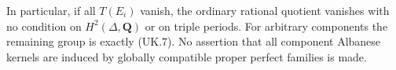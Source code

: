 In particular, if all $T(E_i)$ vanish, the ordinary rational quotient
vanishes with no condition on $H^2(\Delta,\mathbf Q)$ or on triple
periods.  For arbitrary components the remaining group is exactly
(UK.7).  No assertion that all component Albanese kernels are induced
by globally compatible proper perfect families is made.
